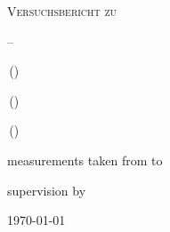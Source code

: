 
\makeatletter
\newcommand*{\protokollemailparse}[1]{%
	\@for\@tempa:=#1\do{%
		\normalsize\email{\@tempa}\\
	}%
}
\makeatother

\begin{titlepage}
	\centering
	{\scshape\LARGE Versuchsbericht zu \par}
	\vspace{1cm}
	{\scshape\huge \varNum {} -- \varName\par}
	\vspace{2.5cm}
	{\LARGE \varGruppe\par}
	\vspace{0.5cm}
	{\large \varNameA \,(\varEmailA) \par}
	{\large \varNameB \,(\varEmailB) \par}
	{\large \varNameC \,(\varEmailC) \par}
	\vfill
	measurements taken from {\large \varDatumA} to {\large \varDatumB}\par
	{supervision by \large \varBetreuer} 
	\vfill	
	{\large \today\par}
\end{titlepage}


\maketitle
